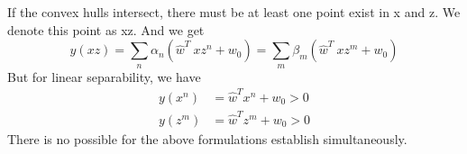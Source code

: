 \documentclass[a4paper]{article}
\begin{document}
\begin{enumerate}
\begin{solution}
			If the convex hulls intersect, there must be at least one point exist in {x} and {z}. We denote this point as xz. And we get
			\begin{equation*}
				y(xz) = \sum_{n}\alpha_n(\hat{w}^T\ xz^n + w_0) = \sum_{m}\beta_m(\hat{w}^T\ xz^m + w_0)
			\end{equation*}
			But for linear separability, we have
			\begin{equation*}
				\begin{aligned}
				y(x^n) &= \hat{w}^Tx^n + w_0 > 0\\
				y(z^m) &= \hat{w}^Tz^m + w_0 > 0
				\end{aligned}
			\end{equation*}
			There is no possible for the above formulations establish simultaneously.
		\end{solution}
	\end{enumerate}
\end{document}

